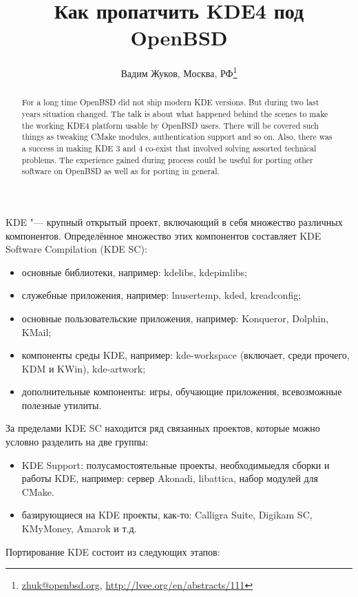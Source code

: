 \documentclass[10pt, a5paper]{article}
\begin{document}
\title{Как пропатчить KDE4 под OpenBSD}
\author{Вадим Жуков, Москва, РФ\footnote{\url{zhuk@openbsd.org}, \url{http://lvee.org/en/abstracts/111}}}
\maketitle
\begin{abstract}
For a long time OpenBSD did not ship modern KDE versions. But during two last years situation changed. The talk is about what happened behind the scenes to make the working KDE4 platform usable by OpenBSD users. There will be covered such things as tweaking CMake modules, authentication support and so on. Also, there was a success in making KDE 3 and 4 co-exist that involved solving assorted technical problems. The experience gained during process could be useful for porting other software on OpenBSD as well as for porting in general.
\end{abstract}
KDE "--- крупный открытый проект, включающий в себя множество различных компонентов. Определённое множество этих компонентов составляет KDE Software Compilation (KDE SC):
\begin{itemize}
 \item основные библиотеки, например: kdelibs, kdepimlibs;
 \item служебные приложения, например: lnusertemp, kded, kread\-con\-fig;
 \item основные пользовательские приложения, например: Kon\-quer\-or, Dolphin, KMail;
 \item компоненты среды KDE, например: kde-workspace (включает, среди прочего, KDM и KWin), kde-artwork;
 \item дополнительные компоненты: игры, обучающие приложения, всевозможные полезные утилиты.
\end{itemize}

За пределами KDE SC находится ряд связанных проектов, которые можно условно разделить на две группы:
\begin{itemize}
 \item KDE Support: полусамостоятельные проекты, необходимые\linebreak для сборки и работы KDE, например: сервер Akonadi, lib\-at\-ti\-ca, набор модулей для CMake.
 \item базирующиеся на KDE проекты, как-то: Calligra Suite, Digikam SC, KMyMoney, Amarok и т.д.
\end{itemize}

Портирование KDE состоит из следующих этапов:
\end{document}
